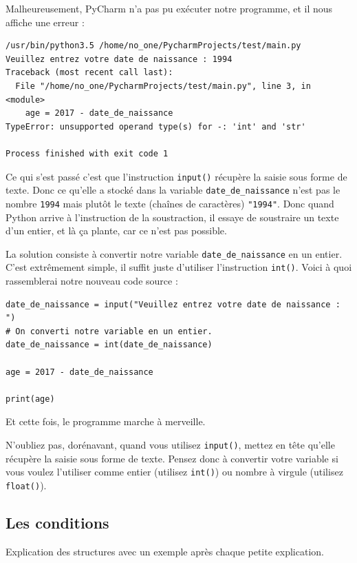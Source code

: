 \documentclass[12pt]{article}
\newcommand{\code}[1]{\colorbox{light-gray}{\texttt{#1}}}
\begin{document}
            Malheureusement, PyCharm n'a pas pu exécuter notre programme, et il nous affiche une erreur :
            \begin{lstlisting}[style=exec_result]
/usr/bin/python3.5 /home/no_one/PycharmProjects/test/main.py
Veuillez entrez votre date de naissance : 1994
Traceback (most recent call last):
  File "/home/no_one/PycharmProjects/test/main.py", line 3, in <module>
    age = 2017 - date_de_naissance
TypeError: unsupported operand type(s) for -: 'int' and 'str'

Process finished with exit code 1
            \end{lstlisting}

            Ce qui s'est passé c'est que l'instruction \code{input()} récupère la saisie sous forme de texte. Donc
            ce qu'elle a stocké dans la variable \code{date\_de\_naissance} n'est pas le nombre \code{1994} mais plutôt
            le texte (chaînes de caractères) \code{"1994"}. Donc quand Python arrive à l'instruction de la soustraction,
            il essaye de soustraire un texte d'un entier, et là ça plante, car ce n'est pas possible.

            La solution consiste à convertir notre variable \code{date\_de\_naissance} en un entier. C'est extrêmement 
            simple, il suffit juste d'utiliser l'instruction \code{int()}. Voici à quoi rassemblerai notre nouveau
            code source :
            \begin{lstlisting}[style=code, breaklines=false]
date_de_naissance = input("Veuillez entrez votre date de naissance : ")
# On converti notre variable en un entier.
date_de_naissance = int(date_de_naissance)

age = 2017 - date_de_naissance

print(age) 
            \end{lstlisting}

            Et cette fois, le programme marche à merveille. 

            N'oubliez pas, dorénavant, quand vous utilisez \code{input()},
            mettez en tête qu'elle récupère la saisie sous forme de texte. Pensez donc à convertir votre variable si 
            vous voulez l'utiliser comme entier (utilisez \code{int()}) ou nombre à virgule (utilisez \code{float()}).

    \subsection{Les conditions}
        Explication des structures avec un exemple après chaque petite explication.
\end{document}
